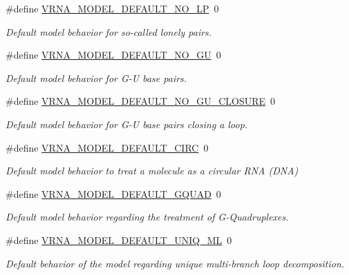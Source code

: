 \begin{DoxyCompactItemize}
\#define \hyperlink{group__model__details_gab72462726dd60ed0d43339bbf7ee08ad}{V\+R\+N\+A\+\_\+\+M\+O\+D\+E\+L\+\_\+\+D\+E\+F\+A\+U\+L\+T\+\_\+\+N\+O\+\_\+\+LP}~0
\begin{DoxyCompactList}\small\item\em Default model behavior for so-\/called \textquotesingle{}lonely pairs\textquotesingle{}. \end{DoxyCompactList}\item 
\#define \hyperlink{group__model__details_ga34702f7d14d38b877ba8e475281e97e2}{V\+R\+N\+A\+\_\+\+M\+O\+D\+E\+L\+\_\+\+D\+E\+F\+A\+U\+L\+T\+\_\+\+N\+O\+\_\+\+GU}~0
\begin{DoxyCompactList}\small\item\em Default model behavior for G-\/U base pairs. \end{DoxyCompactList}\item 
\#define \hyperlink{group__model__details_ga5308de46faaca4b9fd16045864901ee7}{V\+R\+N\+A\+\_\+\+M\+O\+D\+E\+L\+\_\+\+D\+E\+F\+A\+U\+L\+T\+\_\+\+N\+O\+\_\+\+G\+U\+\_\+\+C\+L\+O\+S\+U\+RE}~0
\begin{DoxyCompactList}\small\item\em Default model behavior for G-\/U base pairs closing a loop. \end{DoxyCompactList}\item 
\#define \hyperlink{group__model__details_ga22059033db7bcd875c51fec32425490a}{V\+R\+N\+A\+\_\+\+M\+O\+D\+E\+L\+\_\+\+D\+E\+F\+A\+U\+L\+T\+\_\+\+C\+I\+RC}~0
\begin{DoxyCompactList}\small\item\em Default model behavior to treat a molecule as a circular R\+NA (D\+NA) \end{DoxyCompactList}\item 
\#define \hyperlink{group__model__details_ga793ed812e86f43799b14b2deee917f23}{V\+R\+N\+A\+\_\+\+M\+O\+D\+E\+L\+\_\+\+D\+E\+F\+A\+U\+L\+T\+\_\+\+G\+Q\+U\+AD}~0
\begin{DoxyCompactList}\small\item\em Default model behavior regarding the treatment of G-\/\+Quadruplexes. \end{DoxyCompactList}\item 
\#define \hyperlink{group__model__details_ga63f6006a02ba2d89148441f406c309e7}{V\+R\+N\+A\+\_\+\+M\+O\+D\+E\+L\+\_\+\+D\+E\+F\+A\+U\+L\+T\+\_\+\+U\+N\+I\+Q\+\_\+\+ML}~0
\begin{DoxyCompactList}\small\item\em Default behavior of the model regarding unique multi-\/branch loop decomposition. \end{DoxyCompactList}\item 

\end{DoxyCompactItemize}
